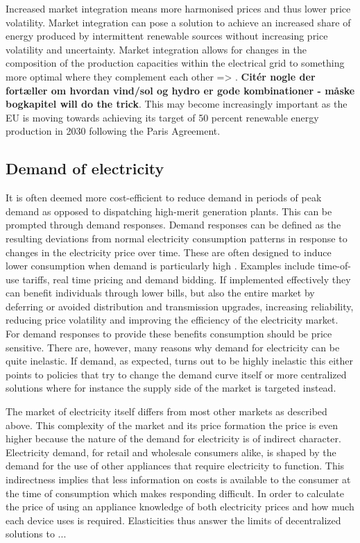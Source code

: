 Increased market integration means more harmonised prices and thus lower price volatility. Market integration can pose a solution to achieve an increased share of energy produced by intermittent renewable sources without increasing price volatility and uncertainty. Market integration allows for changes in the composition of the production capacities within the electrical grid to something more optimal where they complement each other => . \textbf{Citér nogle der fortæller om hvordan vind/sol og hydro er gode kombinationer - måske bogkapitel will do the trick}. This may become increasingly important as the EU is moving towards achieving its target of 50 percent renewable energy production in 2030 following the Paris Agreement.

\subsection{Demand of electricity}
\label{subsec:t_demand}
It is often deemed more cost-efficient to reduce demand in periods of peak demand as opposed to dispatching high-merit generation plants. This can be prompted through demand responses. Demand responses can be defined as the resulting deviations from normal electricity consumption patterns in response to changes in the electricity price over time. These are often designed to induce lower consumption when demand is particularly high \citep{albadi2008summary}. Examples include time-of-use tariffs, real time pricing and demand bidding. If implemented effectively they can benefit individuals through lower bills, but also the entire market by deferring or avoided distribution and transmission upgrades, increasing reliability, reducing price volatility and improving the efficiency of the electricity market. For demand responses to provide these benefits consumption should be price sensitive. There are, however, many reasons why demand for electricity can be quite inelastic. If demand, as expected, turns out to be highly inelastic this either points to policies that try to change the demand curve itself or more centralized solutions where for instance the supply side of the market is targeted instead.
\par

The market of electricity itself differs from most other markets as described above. This complexity of the market and its price formation the price is even higher because the nature of the demand for electricity is of indirect character. Electricity demand, for retail and wholesale consumers alike, is shaped by the demand for the use of other appliances that require electricity to function.
This indirectness implies that less information on costs is available to the consumer at the time of consumption which makes responding difficult. In order to calculate the price of using an appliance knowledge of both electricity prices and how much each device uses is required. Elasticities thus answer the limits of decentralized solutions to ...
\par

